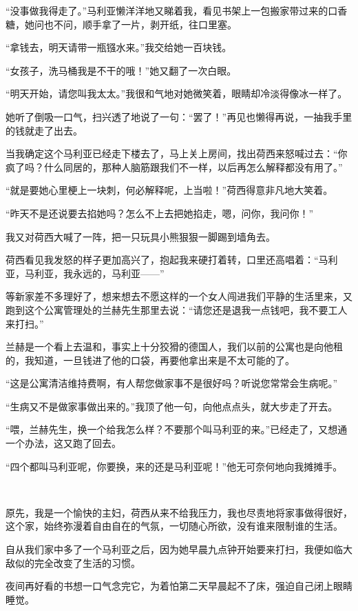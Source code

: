 \par “没事做我得走了。”马利亚懒洋洋地又睇着我，看见书架上一包搬家带过来的口香糖，她问也不问，顺手拿了一片，剥开纸，往口里塞。
\par “拿钱去，明天请带一瓶镪水来。”我交给她一百块钱。
\par “女孩子，洗马桶我是不干的哦！”她又翻了一次白眼。
\par “明天开始，请您叫我太太。”我很和气地对她微笑着，眼睛却冷淡得像冰一样了。
\par 她听了倒吸一口气，扫兴透了地说了一句：“罢了！”再见也懒得再说，一抽我手里的钱就走了出去。
\par 当我确定这个马利亚已经走下楼去了，马上关上房间，找出荷西来怒喊过去：“你疯了吗？什么同居的，那种人脑筋跟我们不一样，以后再怎么解释都没有用了。”
\par “就是要她心里梗上一块刺，何必解释呢，上当啦！”荷西得意非凡地大笑着。
\par “昨天不是还说要去掐她吗？怎么不上去把她掐走，嗯，问你，我问你！”
\par 我又对荷西大喊了一阵，把一只玩具小熊狠狠一脚踢到墙角去。
\par 荷西看见我发怒的样子更加高兴了，抱起我来硬打着转，口里还高唱着：“马利亚，马利亚，我永远的，马利亚——”
\par 等新家差不多理好了，想来想去不愿这样的一个女人闯进我们平静的生活里来，又跑到这个公寓管理处的兰赫先生那里去说：“请您还是退我一点钱吧，我不要工人来打扫。”
\par 兰赫是一个看上去温和，事实上十分狡猾的德国人，我们以前的公寓也是向他租的，我知道，一旦钱进了他的口袋，再要他拿出来是不太可能的了。
\par “这是公寓清洁维持费啊，有人帮您做家事不是很好吗？听说您常常会生病呢。”
\par “生病又不是做家事做出来的。”我顶了他一句，向他点点头，就大步走了开去。
\par “喂，兰赫先生，换一个给我怎么样？不要那个叫马利亚的来。”已经走了，又想通一个办法，这又跑了回去。
\par “四个都叫马利亚呢，你要换，来的还是马利亚呢！”他无可奈何地向我摊摊手。
\par  
\par 原先，我是一个愉快的主妇，荷西从来不给我压力，我也尽责地将家事做得很好，这个家，始终弥漫着自由自在的气氛，一切随心所欲，没有谁来限制谁的生活。
\par 自从我们家中多了一个马利亚之后，因为她早晨九点钟开始要来打扫，我便如临大敌似的完全改变了生活的习惯。
\par 夜间再好看的书想一口气念完它，为着怕第二天早晨起不了床，强迫自己闭上眼睛睡觉。
